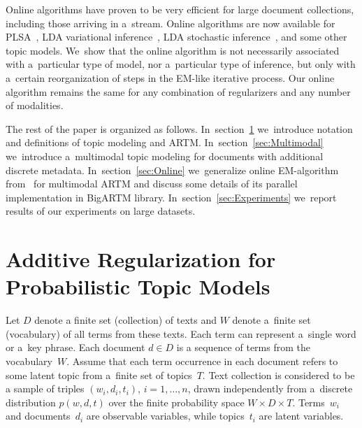 \documentclass{acm_proc_article-sp}
\begin{document}
Online algorithms have proven to be very efficient
for large document collections, including those arriving in a~stream.
Online algorithms are now available for
PLSA~\cite{bassiou14online},
LDA variational inference~\cite{hoffman10online},
LDA stochastic inference~\cite{mimno12sparse}, and
some other topic models.
We~show that the online algorithm is not necessarily associated with
a~particular type of model, nor
a~particular type of inference,
but only with a~certain reorganization of steps in the EM-like iterative process.
Our online algorithm remains the same
for any combination of regularizers and any number of modalities.

The rest of the paper is organized as follows.
%
In~section~\ref{sec:ARTM}
we~introduce notation and definitions of topic modeling and ARTM.
%
In~section~\ref{sec:Multimodal}
we~introduce a~multimodal topic modeling for documents with additional discrete metadata.
%
In~section~\ref{sec:Online}
we~generalize online EM-algorithm from~\cite{hoffman10online} for multimodal ARTM
%
and discuss some details of its parallel implementation in BigARTM library.
%
In~section~\ref{sec:Experiments}
we~report results of our experiments on large datasets.
%

\section{Additive Regularization for\\ Probabilistic Topic Models}
\label{sec:ARTM}


Let
$D$ denote a finite set (collection) of texts and
$W$ denote a~finite set (vocabulary) of all terms from these texts.
Each term can represent a~single word or a~key phrase.
Each document ${d\in D}$ is a sequence of terms from the vocabulary~$W$.
Assume that
each term occurrence in each document refers to some latent topic from a~finite set of topics~$T$.
Text collection is considered to be a sample of triples
$(w_i,d_i,t_i)$,\; ${i=1,\dots,n}$,
drawn independently from a~discrete distribution $p(w,d,t)$
over the finite probability space $W\times D \times T$.
Terms~$w_i$ and documents~$d_i$ are observable variables,
while topics~$t_i$ are latent variables.
\end{document}
